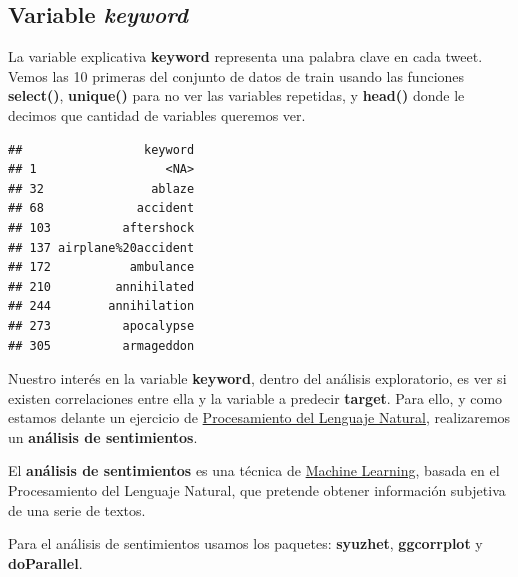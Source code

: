 \documentclass[]{article}
\newenvironment{Shaded}{\begin{snugshade}}{\end{snugshade}}
\newcommand{\DecValTok}[1]{\textcolor[rgb]{0.00,0.00,0.81}{#1}}
\newcommand{\KeywordTok}[1]{\textcolor[rgb]{0.13,0.29,0.53}{\textbf{#1}}}
\newcommand{\NormalTok}[1]{#1}
\newcommand{\OperatorTok}[1]{\textcolor[rgb]{0.81,0.36,0.00}{\textbf{#1}}}
\newcommand{\StringTok}[1]{\textcolor[rgb]{0.31,0.60,0.02}{#1}}
\begin{document}
\hypertarget{variable-keyword}{%
\subsection{\texorpdfstring{Variable
\emph{keyword}}{Variable keyword}}\label{variable-keyword}}

La variable explicativa \textbf{keyword} representa una palabra clave en cada tweet. Vemos las 10 primeras del conjunto de datos de train usando las funciones \textbf{select()}, \textbf{unique()} para no ver las variables repetidas, y \textbf{head()} donde le decimos que cantidad de variables queremos ver.

\vspace{3mm}

\begin{Shaded}
\end{Shaded}

\begin{verbatim}
##                 keyword
## 1                  <NA>
## 32               ablaze
## 68             accident
## 103          aftershock
## 137 airplane%20accident
## 172           ambulance
## 210         annihilated
## 244        annihilation
## 273          apocalypse
## 305          armageddon
\end{verbatim}

Nuestro interés en la variable \textbf{keyword}, dentro del análisis exploratorio, es ver si existen correlaciones entre ella y la variable a predecir \textbf{target}. Para ello, y como estamos delante un ejercicio de \href{https://es.wikipedia.org/wiki/Procesamiento_de_lenguajes_naturales}{\color{blue}Procesamiento del Lenguaje Natural}, realizaremos un \textbf{análisis de sentimientos}.

\begin{tcolorbox}
	El \textbf{análisis de sentimientos} es una técnica de \href{https://en.wikipedia.org/wiki/Machine_learning}{\color{blue}Machine Learning},
	basada en el Procesamiento del Lenguaje Natural, que pretende obtener información subjetiva de una
	serie de textos.
\end{tcolorbox}

Para el análisis de sentimientos usamos los paquetes: \textbf{syuzhet}, \textbf{ggcorrplot} y \textbf{doParallel}.
\end{document}
